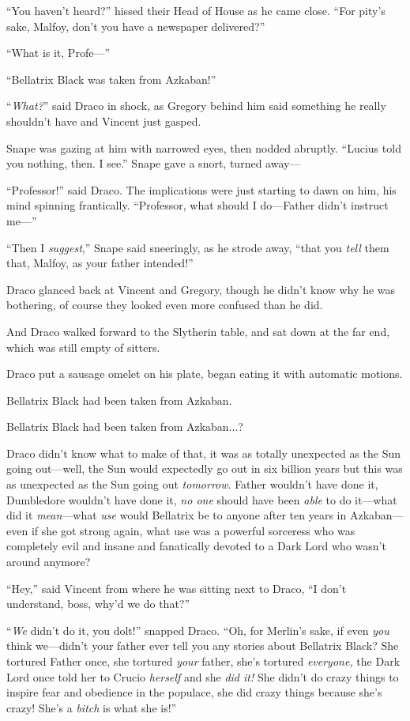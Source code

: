 “You haven’t heard?” hissed their Head of House as he came close. “For pity’s sake, Malfoy, don’t you have a newspaper delivered?”

“What is it, Profe—”

“Bellatrix Black was taken from Azkaban!”

“\emph{What?}” said Draco in shock, as Gregory behind him said something he really shouldn’t have and Vincent just gasped.

Snape was gazing at him with narrowed eyes, then nodded abruptly. “Lucius told you nothing, then. I see.” Snape gave a snort, turned away—

“Professor!” said Draco. The implications were just starting to dawn on him, his mind spinning frantically. “Professor, what should I do—Father didn’t instruct me—”

“Then I \emph{suggest},” Snape said sneeringly, as he strode away, “that you \emph{tell} them that, Malfoy, as your father intended!”

Draco glanced back at Vincent and Gregory, though he didn’t know why he was bothering, of course they looked even more confused than he did.

And Draco walked forward to the Slytherin table, and sat down at the far end, which was still empty of sitters.

Draco put a sausage omelet on his plate, began eating it with automatic motions.

Bellatrix Black had been taken from Azkaban.

Bellatrix Black had been taken from Azkaban...?

Draco didn’t know what to make of that, it was as totally unexpected as the Sun going out—well, the Sun would expectedly go out in six billion years but this was as unexpected as the Sun going out \emph{tomorrow}. Father wouldn’t have done it, Dumbledore wouldn’t have done it, \emph{no one} should have been \emph{able} to do it—what did it \emph{mean}—what \emph{use} would Bellatrix be to anyone after ten years in Azkaban—even if she got strong again, what use was a powerful sorceress who was completely evil and insane and fanatically devoted to a Dark Lord who wasn’t around anymore?

“Hey,” said Vincent from where he was sitting next to Draco, “I don’t understand, boss, why’d we do that?”

“\emph{We} didn’t do it, you dolt!” snapped Draco. “Oh, for Merlin’s sake, if even \emph{you} think we—didn’t your father ever tell you any stories about Bellatrix Black? She tortured Father once, she tortured \emph{your} father, she’s tortured \emph{everyone,} the Dark Lord once told her to Crucio \emph{herself} and she \emph{did it!} She didn’t do crazy things to inspire fear and obedience in the populace, she did crazy things because she’s crazy! She’s a \emph{bitch} is what she is!”

